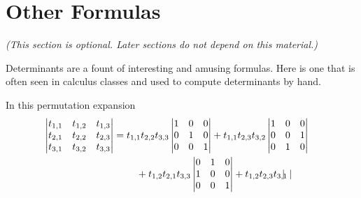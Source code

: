 \section{Other Formulas}
\textit{(This section is optional.
  Later sections do not depend on this material.)}

Determinants are a fount of interesting and amusing formulas.
Here is one that is often seen in calculus classes and used
to compute determinants by hand.




\begin{example}  \label{ex:ExpThreeFirstRow}
In this permutation expansion
\begin{align*}
  \begin{vmatrix}
              t_{1,1}  &t_{1,2}  &t_{1,3}  \\
              t_{2,1}  &t_{2,2}  &t_{2,3}  \\
              t_{3,1}  &t_{3,2}  &t_{3,3}
           \end{vmatrix}             
  &=\begin{aligned}[t]
     &t_{1,1}t_{2,2}t_{3,3}\begin{vmatrix}
                             1  &0  &0  \\
                             0  &1  &0  \\
                             0  &0  &1
                           \end{vmatrix}
      +t_{1,1}t_{2,3}t_{3,2}\begin{vmatrix}
                              1  &0  &0  \\
                              0  &0  &1  \\
                              0  &1  &0
                            \end{vmatrix}           \\
      &\hbox{}\quad\hbox{}
         +t_{1,2}t_{2,1}t_{3,3}\begin{vmatrix}
                                 0  &1  &0  \\
                                 1  &0  &0  \\
                                 0  &0  &1
                                \end{vmatrix}
         +t_{1,2}t_{2,3}t_{3,1}\begin{vmatrix}

\end{vmatrix}
\end{aligned}
\end{align*}
\end{example}
